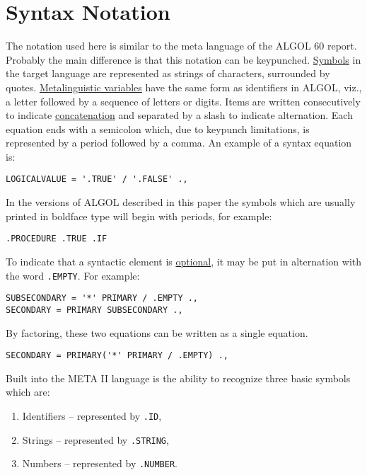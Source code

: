 \documentclass[notitlepage,twocolumn]{report}
\begin{document}
\section*{Syntax Notation}

The notation used here is similar to the meta language of the ALGOL 60
report. Probably the main difference is that this notation can be
keypunched. \underline{Symbols} in the target language are represented
as strings of characters, surrounded by
quotes. \underline{Metalinguistic variables} have the same form as
identifiers in ALGOL, viz., a letter followed by a sequence of letters
or digits. Items are written consecutively to indicate
\underline{concatenation} and separated by a slash to indicate
alternation. Each equation ends with a semicolon which, due to
keypunch limitations, is represented by a period followed by a
comma. An example of a syntax equation is:

\begin{verbatim}
LOGICALVALUE = '.TRUE' / '.FALSE' .,
\end{verbatim}

In the versions of ALGOL described in this paper the symbols which are
usually printed in boldface type will begin with periods, for example:

\begin{verbatim}
.PROCEDURE .TRUE .IF
\end{verbatim}

To indicate that a syntactic element is \underline{optional}, it may
be put in alternation with the word \texttt{.EMPTY}. For example:

\begin{verbatim}
SUBSECONDARY = '*' PRIMARY / .EMPTY .,
SECONDARY = PRIMARY SUBSECONDARY .,
\end{verbatim}

By factoring, these two equations can be written as a single equation.

\begin{verbatim}
SECONDARY = PRIMARY('*' PRIMARY / .EMPTY) .,
\end{verbatim}

Built into the META II language is the ability to recognize three
basic symbols which are:

\begin{enumerate}
\item Identifiers -- represented by \texttt{.ID},
\item Strings -- represented by \texttt{.STRING},
\item Numbers -- represented by \texttt{.NUMBER}.
\end{enumerate}
\end{document}
